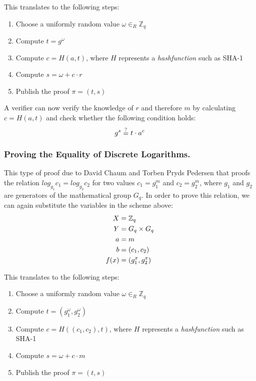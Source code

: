 \documentclass[numbers=noenddot, abstract=on, a4paper, headsepline,
footsepline, oneside, draft=off]{scrreprt}
\begin{document}
This translates to the following steps:

\begin{enumerate}
  \item Choose a uniformly random value $\omega \in_R \mathbb{Z}_q$
  \item Compute $t=g^\omega$
  \item Compute $c=H(a,t)$, where $H$ represents a \textit{hashfunction} such as
  SHA-1
  \item Compute $s=\omega + c \cdot r$
  \item Publish the proof $\pi = (t,s)$
\end{enumerate}

A verifier can now verify the knowledge of $r$ and therefore $m$ by calculating
$c=H(a,t)$ and check whether the following condition holds:
\begin{equation}
	g^s \stackrel{?}{=} t \cdot a^c \notag
\end{equation}

\subsubsection{Proving the Equality of Discrete Logarithms.}
This type of proof due to David Chaum and Torben Pryds Pedersen \cite{CP93}
that proofs the relation $log_{g_1} c_1 = log_{g_2} c_2 $ for two values $c_1 =
g_1^m$ and $c_2 = g_2^m$, where $g_1$ and $g_2$ are generators of the
mathematical group $G_q$. In order to prove this relation, we can again
substitute the variables in the scheme above:
\begin{align}
  X &= \mathbb{Z}_q \notag \\
  Y &= G_q \times G_q \notag \\
  a &=m \notag \\
  b &=(c_1, c_2) \notag \\
  f(x) &= (g_1^x, g_2^x) \notag
\end{align} 

This translates to the following steps:

\begin{enumerate}
  \item Choose a uniformly random value $\omega \in_R \mathbb{Z}_q$
  \item Compute $t=(g_1^\omega, g_2^\omega)$
  \item Compute $c=H((c_1,c_2),t)$, where $H$ represents a \textit{hashfunction}
  such as SHA-1
  \item Compute $s=\omega + c \cdot m$
  \item Publish the proof $\pi = (t,s)$
\end{enumerate}
\end{document}
